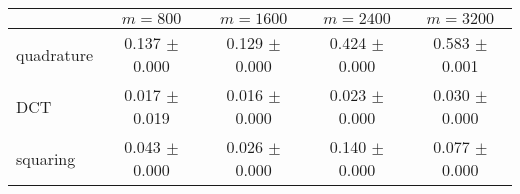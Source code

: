 \centering
\renewcommand{\arraystretch}{1.2}
\begin{tabular}{@{}lcccc@{}}
\toprule
 & $m=800$ & $m=1600$ & $m=2400$ & $m=3200$\\
\midrule
quadrature & 0.137 $\pm$ 0.000 & 0.129 $\pm$ 0.000 & 0.424 $\pm$ 0.000 & 0.583 $\pm$ 0.001 \\
DCT & 0.017 $\pm$ 0.019 & 0.016 $\pm$ 0.000 & 0.023 $\pm$ 0.000 & 0.030 $\pm$ 0.000 \\
squaring & 0.043 $\pm$ 0.000 & 0.026 $\pm$ 0.000 & 0.140 $\pm$ 0.000 & 0.077 $\pm$ 0.000 \\
\bottomrule
\end{tabular}
